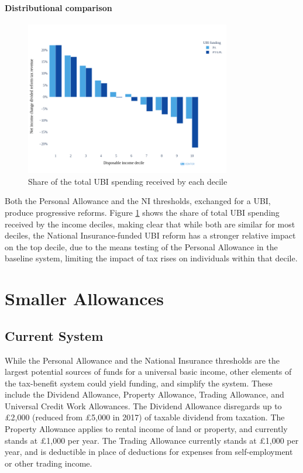 \documentclass{article}
\begin{document}
    \paragraph{Distributional comparison}

    \begin{figure}
        \centering
        \includegraphics[width=0.8\textwidth]{images/fig_10.png}
        \caption{Share of the total UBI spending received by each decile}
        \label{fig:PA_NI_distr_comp}
    \end{figure}

    Both the Personal Allowance and the NI thresholds, exchanged for a UBI, produce progressive reforms. Figure \ref{fig:PA_NI_distr_comp} shows the share of total UBI spending received by the income deciles, making clear that while both are similar for most deciles, the National Insurance-funded UBI reform has a stronger relative impact on the top decile, due to the means testing of the Personal Allowance in the baseline system, limiting the impact of tax rises on individuals within that decile.

    \section{Smaller Allowances}

    \subsection{Current System}

    While the Personal Allowance and the National Insurance thresholds are the largest potential sources of funds for a universal basic income, other elements of the tax-benefit system could yield funding, and simplify the system. These include the Dividend Allowance, Property Allowance, Trading Allowance, and Universal Credit Work Allowances. The Dividend Allowance disregards up to £2,000 (reduced from £5,000 in 2017) of taxable dividend from taxation. The Property Allowance applies to rental income of land or property, and currently stands at £1,000 per year. The Trading Allowance currently stands at £1,000 per year, and is deductible in place of deductions for expenses from self-employment or other trading income.
\end{document}
